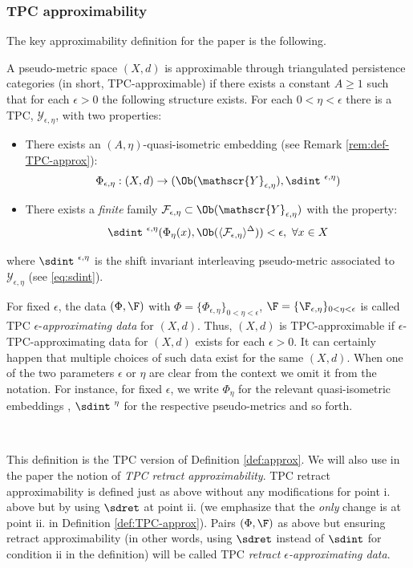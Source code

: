 
\subsubsection{TPC approximability} \label{subsubsec:approx_TPC} The
key approximability definition for the paper is the following.
\begin{dfn}\label{def:TPC-approx} A pseudo-metric space $(X,d)$ is
  approximable through triangulated persistence categories (in short,
  TPC-approximable) if there exists a constant $A\geq 1$ such that for
  each $\epsilon >0$ the following structure exists. For each
  $0< \eta <\epsilon$ there is a TPC, $\mathscr{Y}_{\epsilon,\eta}$, with two
  properties:
  \begin{itemize}
  \item[i.] There exists an $(A,\eta)$-quasi-isometric embedding (see Remark \ref{rem:def-TPC-approx}):
    $$\Phi_{\epsilon,\eta}:(X,d) \to (\Ob(\mathscr{Y}_{\epsilon,\eta}), \sdint^{\ \epsilon,\eta})$$
  \item[ii.] There exists a {\em finite} family
    $\mathcal{F}_{\epsilon,\eta} \subset \Ob(\mathscr{Y}_{\epsilon,\eta})$ with the
    property:
    $$\sdint^{\ \epsilon,\eta}(\Phi_{\eta}(x), \Ob( \langle\mathcal{F}_{\epsilon,\eta}
    \rangle ^{\Delta}) ) < \epsilon, \ \forall x\in X$$
  \end{itemize} 
  where $\sdint^{\ \epsilon,\eta}$ is the shift invariant interleaving pseudo-metric associated to
  $\mathscr{Y}_{\epsilon,\eta}$ (see \eqref{eq:sdint}).
\end{dfn}

For fixed
$\epsilon$, the data $(\Phi, \F)$ with  $\Phi= \{\Phi_{\epsilon,\eta}\}_{0<\eta <\epsilon}$,
$\F=\{\F_{\epsilon,\eta} \}_{0<\eta<\epsilon}$ is called 
TPC $\epsilon$-{\em approximating data} for $(X,d)$. Thus, $(X,d)$ is
TPC-approximable if $\epsilon$-TPC-approximating data for $(X,d)$
exists for each $\epsilon>0$. It can certainly happen that multiple
choices of such data exist for the same $(X,d)$. When one of the two parameters $\epsilon$ or $\eta$ are clear from the context we omit it from the notation. For instance, for fixed $\epsilon$, we write $\Phi_{\eta}$ for the relevant quasi-isometric embeddings , $\sdint^{\ \eta}$ for the respective pseudo-metrics and so forth. 


\

This definition  is the TPC  version of Definition \ref{def:approx}. 
We will also  use in the paper the notion of  {\em TPC retract approximability}.  TPC retract approximability is defined just as above
without any modifications for point i. above but by using $ \sdret$ at
point ii.  (we emphasize that the {\em only} change is at point ii. in
Definition \ref{def:TPC-approx}). Pairs $(\Phi, \F)$ as above but ensuring retract approximability (in other words, using $\sdret$ instead of $\sdint$ for condition ii in the definition) will be called TPC {\em retract $\epsilon$-approximating data}.

